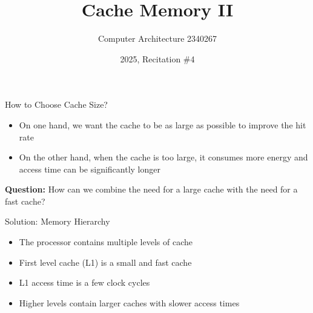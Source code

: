 \documentclass[aspectratio=169,12pt]{beamer}
\title{Cache Memory II}
\author{Computer Architecture 2340267}
\date{2025, Recitation \#4}
\begin{document}
\frame{\titlepage}

\begin{frame}{How to Choose Cache Size?}
\begin{itemize}
    \item On one hand, we want the cache to be as large as possible to improve the hit rate
    \item On the other hand, when the cache is too large, it consumes more energy and access time can be significantly longer
\end{itemize}
\vspace{0.5cm}
\centering
\textbf{Question:} How can we combine the need for a large cache with the need for a fast cache?
\end{frame}

\begin{frame}{Solution: Memory Hierarchy}
\begin{itemize}
    \item The processor contains multiple levels of cache
    \item First level cache (L1) is a small and fast cache
    \item L1 access time is a few clock cycles
    \item Higher levels contain larger caches with slower access times
\end{itemize}
\vspace{0.5cm}
\begin{center}
\end{center}
\end{frame}
\end{document}
